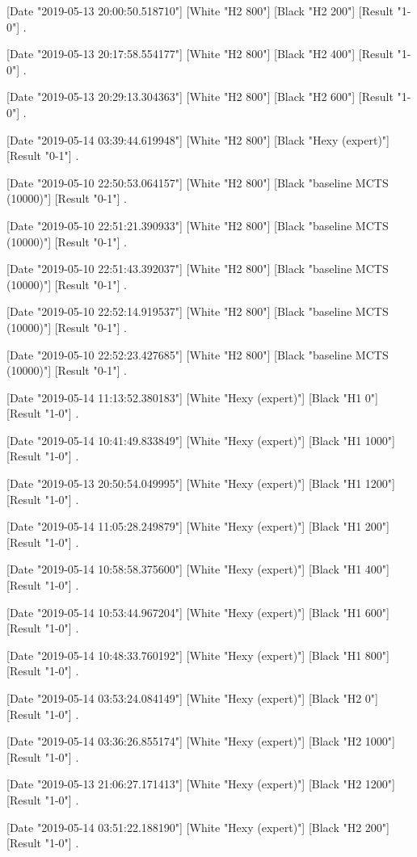 {[Date "2019-05-13 20:00:50.518710"]
[White "H2 800"]
[Black "H2 200"]
[Result "1-0"]
.

[Date "2019-05-13 20:17:58.554177"]
[White "H2 800"]
[Black "H2 400"]
[Result "1-0"]
.

[Date "2019-05-13 20:29:13.304363"]
[White "H2 800"]
[Black "H2 600"]
[Result "1-0"]
.

[Date "2019-05-14 03:39:44.619948"]
[White "H2 800"]
[Black "Hexy (expert)"]
[Result "0-1"]
.

[Date "2019-05-10 22:50:53.064157"]
[White "H2 800"]
[Black "baseline MCTS (10000)"]
[Result "0-1"]
.

[Date "2019-05-10 22:51:21.390933"]
[White "H2 800"]
[Black "baseline MCTS (10000)"]
[Result "0-1"]
.

[Date "2019-05-10 22:51:43.392037"]
[White "H2 800"]
[Black "baseline MCTS (10000)"]
[Result "0-1"]
.

[Date "2019-05-10 22:52:14.919537"]
[White "H2 800"]
[Black "baseline MCTS (10000)"]
[Result "0-1"]
.

[Date "2019-05-10 22:52:23.427685"]
[White "H2 800"]
[Black "baseline MCTS (10000)"]
[Result "0-1"]
.

[Date "2019-05-14 11:13:52.380183"]
[White "Hexy (expert)"]
[Black "H1 0"]
[Result "1-0"]
.

[Date "2019-05-14 10:41:49.833849"]
[White "Hexy (expert)"]
[Black "H1 1000"]
[Result "1-0"]
.

[Date "2019-05-13 20:50:54.049995"]
[White "Hexy (expert)"]
[Black "H1 1200"]
[Result "1-0"]
.

[Date "2019-05-14 11:05:28.249879"]
[White "Hexy (expert)"]
[Black "H1 200"]
[Result "1-0"]
.

[Date "2019-05-14 10:58:58.375600"]
[White "Hexy (expert)"]
[Black "H1 400"]
[Result "1-0"]
.

[Date "2019-05-14 10:53:44.967204"]
[White "Hexy (expert)"]
[Black "H1 600"]
[Result "1-0"]
.

[Date "2019-05-14 10:48:33.760192"]
[White "Hexy (expert)"]
[Black "H1 800"]
[Result "1-0"]
.

[Date "2019-05-14 03:53:24.084149"]
[White "Hexy (expert)"]
[Black "H2 0"]
[Result "1-0"]
.

[Date "2019-05-14 03:36:26.855174"]
[White "Hexy (expert)"]
[Black "H2 1000"]
[Result "1-0"]
.

[Date "2019-05-13 21:06:27.171413"]
[White "Hexy (expert)"]
[Black "H2 1200"]
[Result "1-0"]
.

[Date "2019-05-14 03:51:22.188190"]
[White "Hexy (expert)"]
[Black "H2 200"]
[Result "1-0"]
.

}
